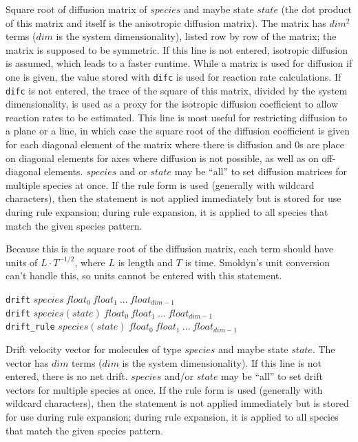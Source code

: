 \documentclass {scrbook}
\newcommand {\ttt} {\texttt}
\begin{document}
\begin{description}
Square root of diffusion matrix of $species$ and maybe state $state$ (the dot product of this matrix and itself is the anisotropic diffusion matrix). The matrix has $dim^2$ terms ($dim$ is the system dimensionality), listed row by row of the matrix; the matrix is supposed to be symmetric. If this line is not entered, isotropic diffusion is assumed, which leads to a faster runtime. While a matrix is used for diffusion if one is given, the value stored with \ttt{difc} is used for reaction rate calculations. If \ttt{difc} is not entered, the trace of the square of this matrix, divided by the system dimensionality, is used as a proxy for the isotropic diffusion coefficient to allow reaction rates to be estimated. This line is most useful for restricting diffusion to a plane or a line, in which case the square root of the diffusion coefficient is given for each diagonal element of the matrix where there is diffusion and 0s are place on diagonal elements for axes where diffusion is not possible, as well as on off-diagonal elements. $species$ and or $state$ may be ``all'' to set diffusion matrices for multiple species at once. If the rule form is used (generally with wildcard characters), then the statement is not applied immediately but is stored for use during rule expansion; during rule expansion, it is applied to all species that match the given species pattern.

Because this is the square root of the diffusion matrix, each term should have units of $L\cdot T^{-1/2}$, where $L$ is length and $T$ is time. Smoldyn's unit conversion can't handle this, so units cannot be entered with this statement.

\item{\ttt{drift} $species\ float_0\ float_1\ ...\ float_{dim-1}$\\
\ttt{drift} $species(state)\ float_0\ float_1\ ...\ float_{dim-1}$\\
\ttt{drift\_rule} $species(state)\ float_0\ float_1\ ...\ float_{dim-1}$}

Drift velocity vector for molecules of type $species$ and maybe state $state$. The vector has $dim$ terms ($dim$ is the system dimensionality). If this line is not entered, there is no net drift. $species$ and/or $state$ may be ``all'' to set drift vectors for multiple species at once. If the rule form is used (generally with wildcard characters), then the statement is not applied immediately but is stored for use during rule expansion; during rule expansion, it is applied to all species that match the given species pattern.


\end{description}
\end{document}
